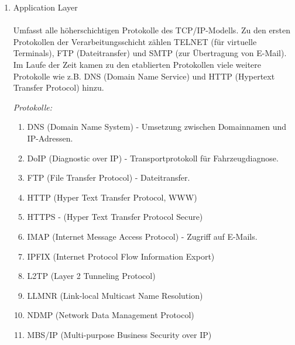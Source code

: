 \documentclass[11pt]{article}
\begin{document}
    \begin{enumerate}
        \item{Application Layer}\\\\
        Umfasst alle höherschichtigen Protokolle des TCP/IP-Modells.
        Zu den ersten Protokollen der Verarbeitungsschicht zählen TELNET (für virtuelle Terminals),
        FTP (Dateitransfer) und SMTP (zur Übertragung von E-Mail).
        Im Laufe der Zeit kamen zu den etablierten Protokollen viele weitere Protokolle wie z.B.
        DNS (Domain Name Service) und HTTP (Hypertext Transfer Protocol) hinzu.\\

        \begin{addmargin}[1em]{1em}
            \emph{Protokolle:}
            \begin{enumerate}[$\diamond$]
                \item DNS (Domain Name System) - Umsetzung zwischen Domainnamen und IP-Adressen.\\
                \item DoIP (Diagnostic over IP) - Transportprotokoll für Fahrzeugdiagnose.\\
                \item FTP (File Transfer Protocol) - Dateitransfer.\\
                \item HTTP (Hyper Text Transfer Protocol, WWW)\\
                \item HTTPS - (Hyper Text Transfer Protocol Secure)\\
                \item IMAP (Internet Message Access Protocol) - Zugriff auf E-Mails.\\
                \item IPFIX (Internet Protocol Flow Information Export)\\
                \item L2TP (Layer 2 Tunneling Protocol)\\
                \item LLMNR (Link-local Multicast Name Resolution)\\
                \item NDMP (Network Data Management Protocol)\\
                \item MBS/IP (Multi-purpose Business Security over IP)\\

\end{enumerate}
\end{addmargin}
\end{enumerate}
\end{document}
